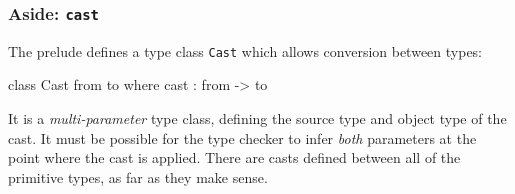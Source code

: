 \subsubsection*{Aside: \texttt{cast}}

The prelude defines a type class \texttt{Cast} which allows conversion between types:

\begin{code}
class Cast from to where
    cast : from -> to
\end{code}

\noindent
It is a \emph{multi-parameter} type class, defining the source type and object type of the cast.
It must be possible for the type checker to infer \emph{both} parameters at the point where the cast is applied.
There are casts defined between all of the primitive types, as far as they make sense.








